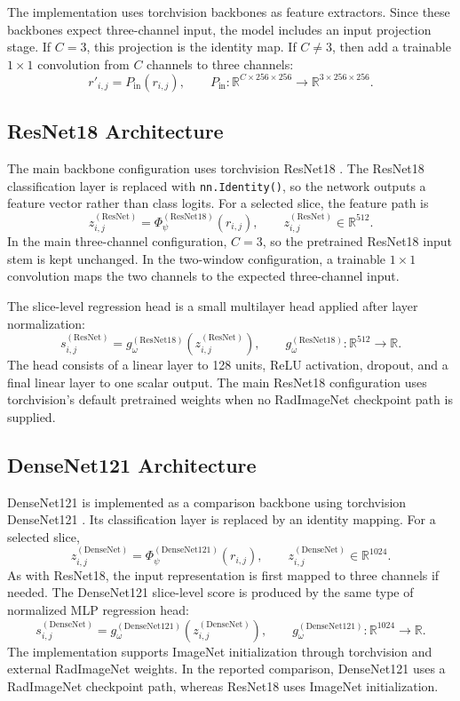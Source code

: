 The implementation uses torchvision backbones as feature extractors. Since these backbones expect three-channel input, the model includes an input projection stage. If \(C=3\), this projection is the identity map. If \(C \neq 3\), then add a trainable \(1 \times 1\) convolution from \(C\) channels to three channels:
\[
r'_{i,j}
=
P_{\mathrm{in}}(r_{i,j}),
\qquad
P_{\mathrm{in}}:
\mathbb{R}^{C \times 256 \times 256}
\rightarrow
\mathbb{R}^{3 \times 256 \times 256}.
\]



\subsection{ResNet18 Architecture}
\label{sec:resnet18_architecture}

The main backbone configuration uses torchvision ResNet18 \cite{he2016residual}. The ResNet18 classification layer is replaced with \texttt{nn.Identity()}, so the network outputs a feature vector rather than class logits. For a selected slice, the feature path is
\[
z_{i,j}^{(\mathrm{ResNet})}
=
\Phi_{\psi}^{(\mathrm{ResNet18})}(r_{i,j}),
\qquad
z_{i,j}^{(\mathrm{ResNet})}
\in
\mathbb{R}^{512}.
\]
In the main three-channel configuration, \(C=3\), so the pretrained ResNet18 input stem is kept unchanged. In the two-window configuration, a trainable \(1 \times 1\) convolution maps the two channels to the expected three-channel input.

The slice-level regression head is a small multilayer head applied after layer normalization:
\[
s_{i,j}^{(\mathrm{ResNet})}
=
g_{\omega}^{(\mathrm{ResNet18})}
\!\left(z_{i,j}^{(\mathrm{ResNet})}\right),
\qquad
g_{\omega}^{(\mathrm{ResNet18})}:
\mathbb{R}^{512}
\rightarrow
\mathbb{R}.
\]
The head consists of a linear layer to 128 units, ReLU activation, dropout, and a final linear layer to one scalar output. The main ResNet18 configuration uses torchvision's default pretrained weights when no RadImageNet checkpoint path is supplied.


\subsection{DenseNet121 Architecture}
\label{sec:densenet121_architecture}

DenseNet121 is implemented as a comparison backbone using torchvision DenseNet121 \cite{huang2017densenet}. Its classification layer is replaced by an identity mapping. For a selected slice,
\[
z_{i,j}^{(\mathrm{DenseNet})}
=
\Phi_{\psi}^{(\mathrm{DenseNet121})}(r_{i,j}),
\qquad
z_{i,j}^{(\mathrm{DenseNet})}
\in
\mathbb{R}^{1024}.
\]
As with ResNet18, the input representation is first mapped to three channels if needed. The DenseNet121 slice-level score is produced by the same type of normalized MLP regression head:
\[
s_{i,j}^{(\mathrm{DenseNet})}
=
g_{\omega}^{(\mathrm{DenseNet121})}
\!\left(z_{i,j}^{(\mathrm{DenseNet})}\right),
\qquad
g_{\omega}^{(\mathrm{DenseNet121})}:
\mathbb{R}^{1024}
\rightarrow
\mathbb{R}.
\]
The implementation supports ImageNet initialization through torchvision and external RadImageNet weights. In the reported comparison, DenseNet121 uses a RadImageNet checkpoint path, whereas ResNet18 uses ImageNet initialization.


